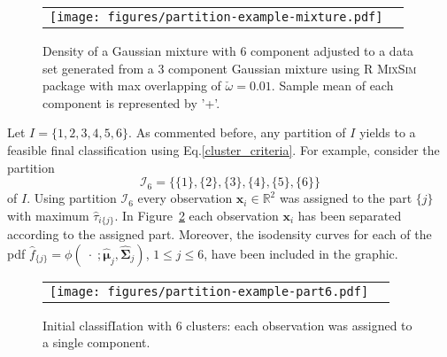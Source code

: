 \documentclass[10pt, a4paper]{article}
\DeclareMathOperator*{\argmax}{arg\,max}
\newcommand{\m}[1]{\boldsymbol{#1}}
\begin{document}
\begin{figure}[thbp]
\begin{center}
\begin{tabular}{cc}
  \texttt{[image: figures/partition-example-mixture.pdf]} \\
 \end{tabular}
 \caption{Density of a Gaussian mixture with 6 component adjusted to a data set generated from a 3 component Gaussian mixture using R \textsc{MixSim} package with max overlapping of $\check{\omega} = 0.01$. Sample mean of each component is represented by '+'.}\label{ex_mixture}
\end{center}
\end{figure}

Let $I = \{1,2,3,4,5,6\}$. As commented before, any partition of $I$ yields to a feasible final classification using Eq.\ref{cluster_criteria}. For example, consider the partition 
\[\mathcal{I}_6 = \{\{1\},\{2\},\{3\},\{4\},\{5\},\{6\}\}\]
of $I$. Using partition $\mathcal{I}_6$ every observation $\m x_i \in \mathbb{R}^2$ was assigned to the part $\{j\}$ with maximum $\hat{\tau}_{i\{j\}}$. In Figure~\ref{ex_part6} each observation $\m x_i$ has been separated according to the assigned part. Moreover, the isodensity curves for each of the pdf $\hat{f}_{\{j\}} = \phi(\;\cdot\; ; \hat{\m\mu}_j, \hat{\m\Sigma}_j)$, $1\leq j \leq 6$, have been included in the graphic. 





\begin{figure}[!h]
\begin{center}
\begin{tabular}{cc}
  \texttt{[image: figures/partition-example-part6.pdf]} \\
 \end{tabular}
 \caption{ Initial classifIation with 6 clusters: each observation was assigned to a single component.}\label{ex_part6}
\end{center}
\end{figure}
\end{document}
